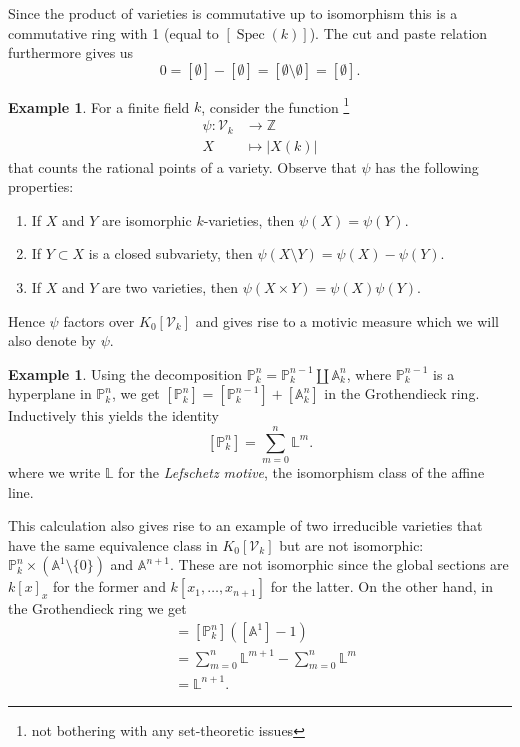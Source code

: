 \documentclass[11pt, a4paper, german, twoside]{article}
\theoremstyle{plain}
\theoremstyle{definition}
\newtheorem{example}[theorem]{Example}
\newcommand{\gring}[1][k]{K_0[\mathcal{V}_#1]}
\DeclareMathOperator{\Spec}{Spec}
\begin{document}
Since the product of varieties is commutative up to isomorphism this is a commutative ring with 1 (equal to $[\Spec(k)]$). 
The cut and paste relation furthermore gives us
\[
    0 = [\emptyset] - [\emptyset] = [\emptyset \setminus \emptyset] = [\emptyset].
\]

\begin{example}
    \label{countMeasure}
    For a finite field $k$, consider the function \footnote{not bothering with any set-theoretic issues} 
    \begin{align*}
        \psi \colon \mathcal{V}_k & \to   \mathbb{Z}\\
        X & \mapsto |X(k)|
    \end{align*}
    that counts the rational points of a variety.
    Observe that $\psi$ has the following properties:
    \begin{enumerate}
        \item If $X$ and $Y$ are isomorphic $k$-varieties, then $\psi(X) = \psi(Y)$.
        \item If $Y \subset X$ is a closed subvariety, then $\psi(X \setminus Y) = \psi(X) - \psi(Y)$.
        \item If $X$ and $Y$ are two varieties, then $\psi(X \times Y) = \psi(X)\psi(Y)$.
    \end{enumerate}
    Hence $\psi$ factors over $\gring[k]$ and gives rise to a motivic measure which we will also denote by $\psi$.
\end{example}

\begin{example}
    \label{projSum}
    Using the decomposition $\mathbb{P}_k^n = \mathbb{P}_k^{n-1} \coprod \mathbb{A}_k^n$, where $\mathbb{P}_k^{n-1}$ is a hyperplane
    in $\mathbb{P}_k^n$, we get $[\mathbb{P}_k^n] = [\mathbb{P}_k^{n-1}] + [\mathbb{A}_k^n]$ in the Grothendieck ring.
    Inductively this yields the identity 
    \[
        [\mathbb{P}_k^n] = \sum_{m=0}^n \mathbb{L}^m.
    \]
    where we write $\mathbb{L}$ for the \emph{Lefschetz motive}, the isomorphism class of the affine line.
\end{example}

This calculation also gives rise to an example of two irreducible varieties that have the same equivalence class in $\gring[k]$ but are not
isomorphic: $\mathbb{P}_k^n \times (\mathbb{A}^1\setminus \{0\})$ and $\mathbb{A}^{n+1}$. These are not isomorphic since the global sections 
are $k[x]_{x}$ for the former and $k[x_1,\dots,x_{n+1}]$ for the latter. On the other hand, in the Grothendieck ring we get
\begin{align*}
    [\mathbb{P}_k^n \times \left (\mathbb{A}^1 \setminus \{0\}\right )] &= [\mathbb{P}_k^n]\left ([\mathbb{A}^1] - 1\right ) \\
                                                                      &= \sum_{m=0}^n \mathbb{L}^{m+1} - \sum_{m=0}^n \mathbb{L}^m \\
                                                                      &= \mathbb{L}^{n+1}.
\end{align*}
\end{document}
